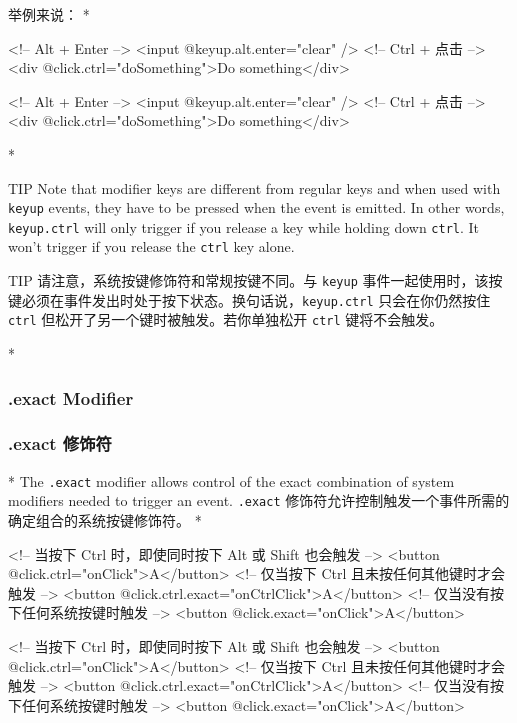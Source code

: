 \begin{paracol}{2}
举例来说：
\switchcolumn[0]*%
\begin{codeHtml}
<!-- Alt + Enter -->
<input @keyup.alt.enter="clear" />
<!-- Ctrl + 点击 -->
<div @click.ctrl="doSomething">Do something</div>
\end{codeHtml}
\switchcolumn
\begin{codeHtml}
<!-- Alt + Enter -->
<input @keyup.alt.enter="clear" />
<!-- Ctrl + 点击 -->
<div @click.ctrl="doSomething">Do something</div>
\end{codeHtml}
\switchcolumn[0]*%
\begin{vueQuote}{TIP}
Note that modifier keys are different from regular keys and when used
with \texttt{keyup} events, they have to be pressed when the event is
emitted. In other words, \texttt{keyup.ctrl} will only trigger if you
release a key while holding down \texttt{ctrl}. It won't trigger if you
release the \texttt{ctrl} key alone.
\end{vueQuote}
\switchcolumn
\begin{vueQuote}{TIP}
请注意，系统按键修饰符和常规按键不同。与 \texttt{keyup}
事件一起使用时，该按键必须在事件发出时处于按下状态。换句话说，\texttt{keyup.ctrl}
只会在你仍然按住 \texttt{ctrl} 但松开了另一个键时被触发。若你单独松开
\texttt{ctrl} 键将不会触发。
\end{vueQuote}


\switchcolumn[0]*%
\subsubsection{.exact Modifier}
\switchcolumn
\subsubsection{.exact 修饰符}
\switchcolumn[0]*%
The \texttt{.exact} modifier allows control of the exact combination of
system modifiers needed to trigger an event.
\switchcolumn
\texttt{.exact}
修饰符允许控制触发一个事件所需的确定组合的系统按键修饰符。
\switchcolumn[0]*%
\begin{codeHtml}
<!-- 当按下 Ctrl 时，即使同时按下 Alt 或 Shift 也会触发 -->
<button @click.ctrl="onClick">A</button>
<!-- 仅当按下 Ctrl 且未按任何其他键时才会触发 -->
<button @click.ctrl.exact="onCtrlClick">A</button>
<!-- 仅当没有按下任何系统按键时触发 -->
<button @click.exact="onClick">A</button>
\end{codeHtml}
\switchcolumn
\begin{codeHtml}
<!-- 当按下 Ctrl 时，即使同时按下 Alt 或 Shift 也会触发 -->
<button @click.ctrl="onClick">A</button>
<!-- 仅当按下 Ctrl 且未按任何其他键时才会触发 -->
<button @click.ctrl.exact="onCtrlClick">A</button>
<!-- 仅当没有按下任何系统按键时触发 -->
<button @click.exact="onClick">A</button>
\end{codeHtml} 
\end{paracol}


